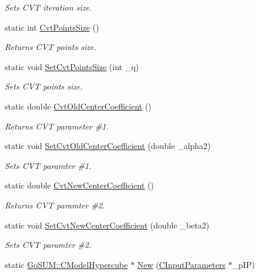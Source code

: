 \begin{DoxyCompactItemize}
\begin{DoxyCompactList}\small\item\em Sets C\-V\-T iteration size. \end{DoxyCompactList}\item 
static int \hyperlink{class_go_s_u_m_1_1_c_hypercube_acc500fc5157c78d0d1d260a502c34288}{Cvt\-Points\-Size} ()
\begin{DoxyCompactList}\small\item\em Returns C\-V\-T points size. \end{DoxyCompactList}\item 
static void \hyperlink{class_go_s_u_m_1_1_c_hypercube_a3c9ed7e8c464c78afc0eb4cf62438df9}{Set\-Cvt\-Points\-Size} (int \-\_\-q)
\begin{DoxyCompactList}\small\item\em Sets C\-V\-T points size. \end{DoxyCompactList}\item 
static double \hyperlink{class_go_s_u_m_1_1_c_hypercube_aaa4c700e7636bc8f8c627f900925af30}{Cvt\-Old\-Center\-Coefficient} ()
\begin{DoxyCompactList}\small\item\em Returns C\-V\-T parameter \#1. \end{DoxyCompactList}\item 
static void \hyperlink{class_go_s_u_m_1_1_c_hypercube_a27859b27c8e541cd42ac0424d7117b88}{Set\-Cvt\-Old\-Center\-Coefficient} (double \-\_\-alpha2)
\begin{DoxyCompactList}\small\item\em Sets C\-V\-T paramter \#1. \end{DoxyCompactList}\item 
static double \hyperlink{class_go_s_u_m_1_1_c_hypercube_a7af9011cef9d24170f558d601307a4f0}{Cvt\-New\-Center\-Coefficient} ()
\begin{DoxyCompactList}\small\item\em Returns C\-V\-T paramter \#2. \end{DoxyCompactList}\item 
static void \hyperlink{class_go_s_u_m_1_1_c_hypercube_a7347f28cd7134c3215ba0fe0c44d65e7}{Set\-Cvt\-New\-Center\-Coefficient} (double \-\_\-beta2)
\begin{DoxyCompactList}\small\item\em Sets C\-V\-T paramter \#2. \end{DoxyCompactList}\item 
static \hyperlink{class_go_s_u_m_1_1_c_model_hypercube}{Go\-S\-U\-M\-::\-C\-Model\-Hypercube} $\ast$ \hyperlink{class_go_s_u_m_1_1_c_hypercube_a737402ef325701acaf51e3a5af5f78df}{New} (\hyperlink{class_go_s_u_m_1_1_c_input_parameters}{C\-Input\-Parameters} $\ast$\-\_\-p\-I\-P)

\end{DoxyCompactItemize}
